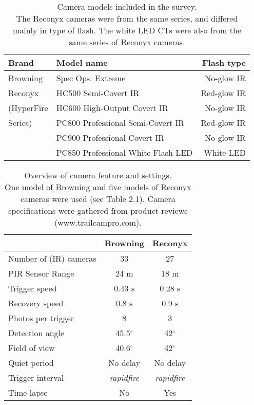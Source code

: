 

\begin{table}[h]
\caption[Camera models]
{Camera models included in the survey. \\ \footnotesize The Reconyx cameras were from the same series, and differed mainly in type of flash. The white LED CTs were also from the same series of Reconyx cameras.}\label{tab:cam_mod}
\centering

\begin{tabular}{llr}
\toprule
Brand  & Model name & Flash type  \\
\midrule
Browning	& Spec Ops: Extreme 					& No-glow IR \\
Reconyx			& HC500 Semi-Covert IR					& Red-glow IR \\
(HyperFire		& HC600 High-Output Covert IR			& No-glow IR  \\
 Series)		& PC800 Professional Semi-Covert IR 	& Red-glow IR \\
			 	& PC900 Professional Covert IR 			& No-glow IR  \\
    			& PC850 Professional White Flash LED	& White LED  \\
\bottomrule
\end{tabular}
\end{table}


\begin{table}[h]
\caption[Camera settings and features]
{Overview of camera feature and settings. \\ \footnotesize One model of Browning and five models of Reconyx cameras were used (see Table 2.1). Camera specifications were gathered from product reviews (www.trailcampro.com). }\label{tab:cam_set}
\centering
\begin{tabular}{lcc}
\toprule 
 & Browning & Reconyx \\ 
\midrule
Number of (IR) cameras 	& 33 	& 27 \\  
PIR Sensor Range 	& 24 m	&	18 m \\
Trigger speed 		& 0.43 s 	& 0.28 s \\ 
Recovery speed 		& 0.8 s		& 0.9 s \\ 
Photos per trigger 	& 8 		& 3 \\  
Detection angle 	& 45.5$^{\circ}$ 	& 42$^{\circ}$ \\ 
Field of view 		& 40.6$^{\circ}$ 	& 42$^{\circ}$ \\  
Quiet period 		& No delay 	& No delay \\ 
Trigger interval	& \emph{rapidfire} & \emph{rapidfire} \\
Time lapse			& No	 	& Yes \\
\bottomrule 
\end{tabular} 
\end{table}




